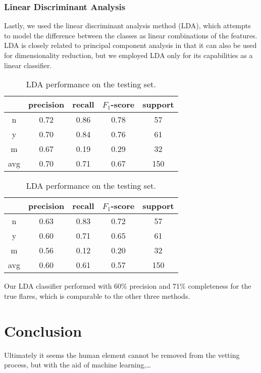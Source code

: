 \documentclass[11pt]{article}
\begin{document}
\subsubsection{Linear Discriminant Analysis}
\label{sec:lda}
Lastly, we used the linear discriminant analysis method (LDA), which
attempts to model the difference between the classes as linear
combinations of the features.  LDA is closely related to principal
component analysis in that it can also be used for dimensionality
reduction, but we employed LDA only for its capabilities as a linear
classifier.
\begin{table}
  \centering
  \begin{tabular}[!htbp]{c|c c c c}
       & precision &recall &$F_1$-score &support \\ \hline
    n  & 0.72      &0.86   &0.78     &57      \\
    y  & 0.70      &0.84   &0.76     &61      \\
    m  & 0.67      &0.19   &0.29     &32      \\ \hline
    avg& 0.70      &0.71   &0.67     &150     \\
  \end{tabular}
  \caption{Reconstructing the training set with linear discriminant method.}

  \begin{tabular}[!htbp]{c|c c c c}
        & precision &recall &$F_1$-score &support \\ \hline
    n   & 0.63      &0.83   &0.72     &57      \\
    y   & 0.60      &0.71   &0.65     &61      \\
    m   & 0.56      &0.12   &0.20     &32      \\ \hline
    avg & 0.60      &0.61   &0.57     &150     \\
  \end{tabular}
  \caption{LDA performance on the testing set.}
\end{table}
Our LDA classifier performed with 60\% precision and 71\% completeness
for the true flares, which is comparable to the other three methods.

\section{Conclusion}
\label{sec:conc}

Ultimately it seems the human element cannot be removed from the
vetting process, but with the aid of machine learning,\ldots




\end{document}
